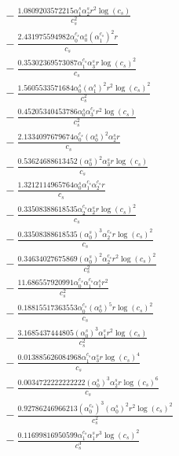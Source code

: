 \documentclass[10pt]{article}
\begin{document}
\begin{align*}
&{}  - \frac{1.0809203572215 \alpha_{1}^s \alpha_{2}^s r^{2} \log{\left(c_{s} \right)}}{c_{s}^{2}} \\
&{}  - \frac{2.431975594982 \alpha_{0}^{c_s} \alpha_{0}^s \left(\alpha_{1}^{c_s}\right)^{2} r}{c_{s}} \\
&{}  - \frac{0.35302369573087 \alpha_{1}^{c_s} \alpha_{3}^s r \log{\left(c_{s} \right)}^{2}}{c_{s}} \\
&{}  - \frac{1.5605533571684 \alpha_{0}^s \left(\alpha_{1}^s\right)^{2} r^{2} \log{\left(c_{s} \right)}^{2}}{c_{s}^{2}} \\
&{}  - \frac{0.45205340453786 \alpha_{0}^s \alpha_{3}^{c_s} r^{2} \log{\left(c_{s} \right)}}{c_{s}^{2}} \\
&{}  - \frac{2.1334097679674 \alpha_{0}^{c_s} \left(\alpha_{0}^s\right)^{2} \alpha_{2}^s r}{c_{s}} \\
&{}  - \frac{0.53624688613452 \left(\alpha_{0}^s\right)^{2} \alpha_{3}^s r \log{\left(c_{s} \right)}}{c_{s}} \\
&{}  - \frac{1.3212114965764 \alpha_{0}^s \alpha_{1}^{c_s} \alpha_{2}^{c_s} r}{c_{s}} \\
&{}  - \frac{0.33508388618535 \alpha_{2}^{c_s} \alpha_{2}^s r \log{\left(c_{s} \right)}^{2}}{c_{s}} \\
&{}  - \frac{0.33508388618535 \left(\alpha_{0}^s\right)^{3} \alpha_{2}^{c_s} r \log{\left(c_{s} \right)}^{2}}{c_{s}} \\
&{}  - \frac{0.34634027675869 \left(\alpha_{0}^s\right)^{2} \alpha_{2}^{c_s} r^{2} \log{\left(c_{s} \right)}^{2}}{c_{s}^{2}} \\
&{}  - \frac{11.686557920991 \alpha_{0}^{c_s} \alpha_{1}^{c_s} \alpha_{1}^s r^{2}}{c_{s}^{2}} \\
&{}  - \frac{0.18815517363553 \alpha_{0}^{c_s} \left(\alpha_{0}^s\right)^{5} r \log{\left(c_{s} \right)}^{2}}{c_{s}} \\
&{}  - \frac{3.1685437444805 \left(\alpha_{0}^s\right)^{3} \alpha_{1}^s r^{2} \log{\left(c_{s} \right)}}{c_{s}^{2}} \\
&{}  - \frac{0.013885626084968 \alpha_{1}^{c_s} \alpha_{3}^s r \log{\left(c_{s} \right)}^{4}}{c_{s}} \\
&{}  - \frac{0.0034722222222222 \left(\alpha_{0}^s\right)^{3} \alpha_{2}^s r \log{\left(c_{s} \right)}^{6}}{c_{s}} \\
&{}  - \frac{0.92786246966213 \left(\alpha_{0}^{c_s}\right)^{3} \left(\alpha_{0}^s\right)^{2} r^{2} \log{\left(c_{s} \right)}^{2}}{c_{s}^{2}} \\
&{}  - \frac{0.11699816950599 \alpha_{1}^{c_s} \alpha_{1}^s r^{3} \log{\left(c_{s} \right)}^{2}}{c_{s}^{3}} \\

\end{align*}
\end{document}
